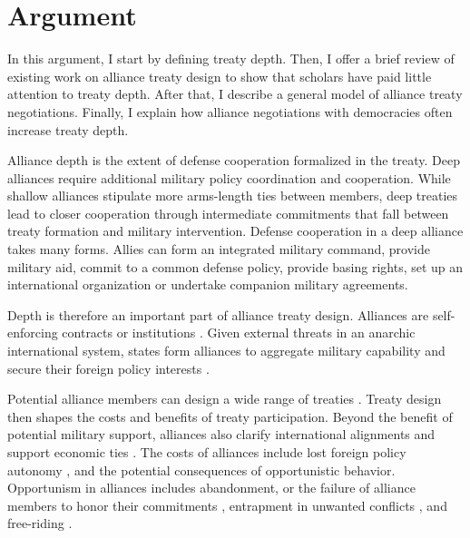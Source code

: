 \documentclass[12pt]{article}
\begin{document}
\section{Argument}


In this argument, I start by defining treaty depth. 
Then, I offer a brief review of existing work on alliance treaty design to show that scholars have paid little attention to treaty depth.  
After that, I describe a general model of alliance treaty negotiations. 
Finally, I explain how alliance negotiations with democracies often increase treaty depth. 


Alliance depth is the extent of defense cooperation formalized in the treaty. 
Deep alliances require additional military policy coordination and cooperation. 
While shallow alliances stipulate more arms-length ties between members, deep treaties lead to closer cooperation through intermediate commitments that fall between treaty formation and military intervention. 
Defense cooperation in a deep alliance takes many forms. 
Allies can form an integrated military command, provide military aid, commit to a common defense policy, provide basing rights, set up an international organization or undertake companion military agreements. 


Depth is therefore an important part of alliance treaty design.
Alliances are self-enforcing contracts or institutions \citep{Leedsetal2002, Morrow2000}.
Given external threats in an anarchic international system, states form alliances to aggregate military capability and secure their foreign policy interests \citep{Altfield1984, Smith1995, Snyder1997, FordhamPoast2014}. 


Potential alliance members can design a wide range of treaties \citep{Leedsetal2000, Leedsetal2002, Benson2012, BensonClinton2016}. 
Treaty design then shapes the costs and benefits of treaty participation. 
Beyond the benefit of potential military support, alliances also clarify international alignments \citep{Snyder1990} and support economic ties \citep{Gowa1995, Li2003, Long2003, Fordham2010, WolfordKim2017}. 
The costs of alliances include lost foreign policy autonomy \citep{Altfield1984, Morrow2000, Johnson2015}, and the potential consequences of opportunistic behavior. 
Opportunism in alliances includes abandonment, or the failure of alliance members to honor their commitments \citep{Leeds2003a, BerkemeierFuhrmann2018}, entrapment in unwanted conflicts \citep{Snyder1984}, and free-riding \citep{Morrow2000}.   
\end{document}
